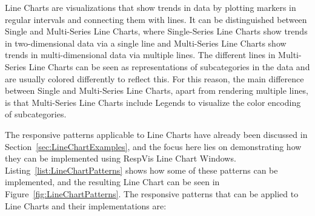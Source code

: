 Line Charts are visualizations that show trends in data by plotting markers in regular intervals and connecting them with lines.
It can be distinguished between Single and Multi-Series Line Charts, where Single-Series Line Charts show trends in two-dimensional data via a single line and Multi-Series Line Charts show trends in multi-dimensional data via multiple lines. 
The different lines in Multi-Series Line Charts can be seen as representations of subcategories in the data and are usually colored differently to reflect this.
For this reason, the main difference between Single and Multi-Series Line Charts, apart from rendering multiple lines, is that Multi-Series Line Charts include Legends to visualize the color encoding of subcategories.

The responsive patterns applicable to Line Charts have already been discussed in Section~\ref{sec:LineChartExamples}, and the focus here lies on demonstrating how they can be implemented using RespVis Line Chart Windows. 
Listing~\ref{list:LineChartPatterns} shows how some of these patterns can be implemented, and the resulting Line Chart can be seen in Figure~\ref{fig:LineChartPatterns}.
The responsive patterns that can be applied to Line Charts and their implementations are:

